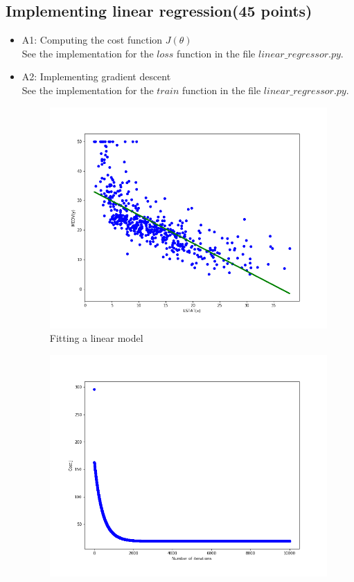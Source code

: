 \documentclass{article}
\begin{document}
\subsection{Implementing linear regression(45 points)}
\begin{itemize}
    \item A1: Computing the cost function $J(\theta)$\\
    See the implementation for the $loss$ function in the file $linear\_regressor.py$.
    \item A2: Implementing gradient descent\\
    See the implementation for the $train$ function in the file $linear\_regressor.py$.\\
\begin{figure}[htbp]
	\centering
	\includegraphics[scale = 0.3]{gradient_descent.png}
	\caption{Fitting a linear model}
\end{figure}
\begin{figure}[htbp]
	\centering
	\includegraphics[scale = 0.3]{J_history.png}

\end{figure}
\end{itemize}
\end{document}
